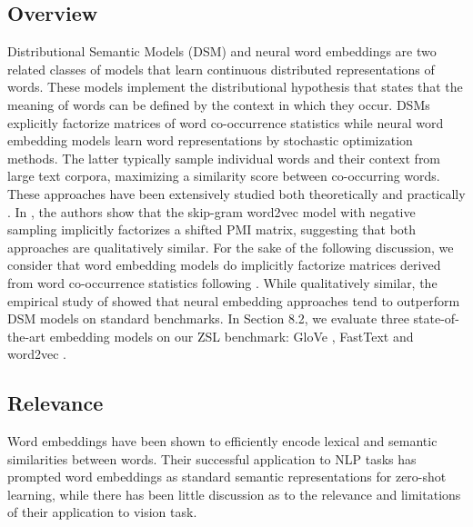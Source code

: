 \subsection{Overview}
Distributional Semantic Models (DSM) and neural word embeddings are two related classes of models that learn continuous distributed representations of words. These models implement the distributional hypothesis that states that the meaning of words can be defined by the context in which they occur. DSMs explicitly factorize matrices of word co-occurrence statistics while neural word embedding models learn word representations by stochastic optimization methods. The latter typically sample individual words and their context from large text corpora, maximizing a similarity score between co-occurring words. These approaches have been extensively studied both theoretically \cite{levy2014neural} and practically \cite{baroni2014don}. In \cite{levy2014neural}, the authors show that the skip-gram word2vec model with negative sampling implicitly factorizes a shifted PMI matrix, suggesting that both approaches are qualitatively similar. For the sake of the following discussion, we consider that word embedding models do implicitly factorize matrices derived from word co-occurrence statistics following \cite{levy2014neural}. While qualitatively similar, the empirical study of \cite{baroni2014don} showed that neural embedding approaches tend to outperform DSM models on standard benchmarks. In Section 8.2, we evaluate three state-of-the-art embedding models on our ZSL benchmark: GloVe \cite{pennington2014glove}, FastText \cite{joulin2017bag} and word2vec \cite{mikolov2013distributed}.

\subsection{Relevance}
Word embeddings have been shown to efficiently encode lexical and semantic similarities between words. Their successful application to NLP tasks has prompted word embeddings as standard semantic representations for zero-shot learning, while there has been little discussion as to the relevance and limitations of their application to vision task. 

